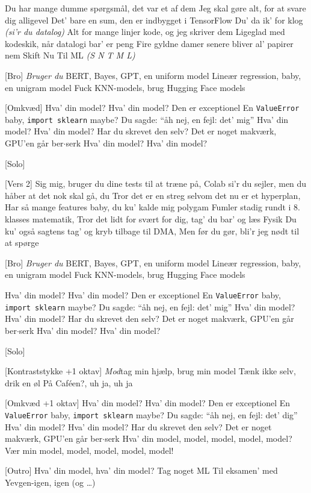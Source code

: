 \documentclass{article}
\begin{document}
\begin{song}
[Vers 1]
%
Du har mange dumme spørgsmål, det var et af dem
Jeg skal gøre alt, for at svare dig alligevel
Det' bare en sum, den er indbygget i TensorFlow
Du' da ik' for klog \textit{(si'r du datalog)}
Alt for mange linjer kode, og jeg skriver dem
Ligeglad med kodeskik, når datalogi bar' er peng
Fire gyldne damer senere bliver al' papirer nem
Skift Nu Til ML \textit{(S N T M L)}

[Bro]
%
\textit{Bruger du} BERT, Bayes, GPT, en uniform model
Lineær regression, baby, en unigram model
Fuck KNN-models, brug Hugging Face models

[Omkvæd]
%
Hva' din model? Hva' din model? Den er exceptionel
En \texttt{ValueError} baby, \texttt{import sklearn} maybe?
Du sagde: ``åh nej, en fejl: det' mig''
Hva' din model? Hva' din model? Har du skrevet den selv?
Det er noget makværk, GPU'en går ber$\cdot$serk
Hva' din model? Hva' din model?

[Solo]

[Vers 2]
%
Sig mig, bruger du dine tests til at træne på,
Colab si'r du sejler, men du håber at det nok skal gå, du
Tror det er en streg selvom det nu er et hyperplan, 
Har så mange features baby, du ku' kalde mig polygam
Fumler stadig rundt i 8. klasses matematik,
Tror det lidt for svært for dig, tag' du bar' og læs Fysik
Du ku' også sagtens tag' og kryb tilbage til DMA,
Men før du gør, bli'r jeg nødt til at spørge

[Bro]
%
\textit{Bruger du} BERT, Bayes, GPT, en uniform model
Lineær regression, baby, en unigram model
Fuck KNN-models, brug Hugging Face models

\newpage%
[Omkvæd]
%
Hva' din model? Hva' din model? Den er exceptionel
En \texttt{ValueError} baby, \texttt{import sklearn} maybe?
Du sagde: ``åh nej, en fejl: det' mig''
Hva' din model? Hva' din model? Har du skrevet den selv?
Det er noget makværk, GPU'en går ber$\cdot$serk
Hva' din model? Hva' din model?

[Solo]

[Kontraststykke +1 oktav]
%
\textit{Mod}tag min hjælp, brug min model
Tænk ikke selv, drik en øl
På Caféen?\@, uh ja, uh ja

[Omkvæd +1 oktav]
%
Hva' din model? Hva' din model? Den er exceptionel
En \texttt{ValueError} baby, \texttt{import sklearn} maybe?
Du sagde: ``åh nej, en fejl: det' dig''
Hva' din model? Hva' din model? Har du skrevet den selv?
Det er noget makværk, GPU'en går ber$\cdot$serk
Hva' din model, model, model, model, model?
Vær min model, model, model, model, model!

[Outro]
%
Hva' din model, hva' din model?
Tag noget ML
Til eksamen' med Yevgen-igen, igen (og …)
\end{song}
\end{document}
